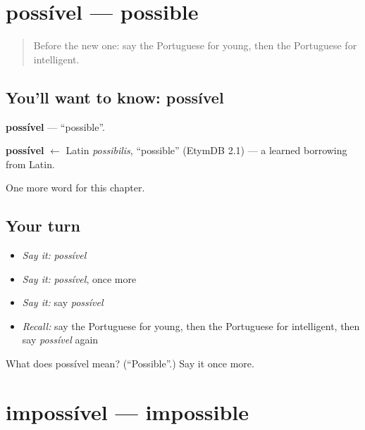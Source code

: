 \section[possível]{possível — possible}

\label{lesson:PT-C243-possivel}



\begin{quote}
Before the new one: say the Portuguese for young, then the Portuguese for intelligent.
\end{quote}

\subsection*{You'll want to know: possível}
\textbf{possível} — \textquotedblleft{}possible\textquotedblright{}.

\begin{cousinweb}
\textbf{possível} $\leftarrow$ Latin \emph{possibilis}, \textquotedblleft{}possible\textquotedblright{} (EtymDB 2.1) — a learned borrowing from Latin.
\end{cousinweb}

\begin{grammarlens}[title={What you've built}]
One more word for this chapter.
\end{grammarlens}

\subsection*{Your turn}
\begin{itemize}
\raggedright
  \item \emph{Say it:} \emph{possível}
  \item \emph{Say it:} \emph{possível}, once more
  \item \emph{Say it:} say \emph{possível}
  \item \emph{Recall:} say the Portuguese for young, then the Portuguese for intelligent, then say \emph{possível} again
\end{itemize}

\begin{tcolorbox}[breakable,colback=teal!4,colframe=teal!35!black,title={Before you move on}]
What does possível mean? (\textquotedblleft{}Possible\textquotedblright{}.) Say it once more.
\end{tcolorbox}
\section[impossível]{impossível — impossible}

